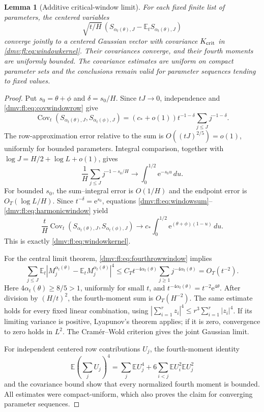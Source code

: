 \documentclass[11pt,letterpaper]{article}
\numberwithin{equation}{section}
\newtheorem{lemma}[theorem]{Lemma}
\theoremstyle{definition}\newtheorem{definition}[theorem]{Definition}
\theoremstyle{remark}\newtheorem{remark}[theorem]{Remark}
\newcommand{\E}{\mathbb E}
\newcommand{\ee}{\mathrm e}
\DeclareMathOperator{\Cov}{Cov}
\begin{document}
\begin{lemma}[Additive critical-window limit]\label{dmv:fl:lem:additivewindow}
For each fixed finite list of parameters, the centered variables
\[
 \sqrt{t/H}\,
 (S_{\alpha_t(\theta),J}-\E_tS_{\alpha_t(\theta),J})
\]
converge jointly to a centered Gaussian vector with covariance
$K_{\rm crit}$ in \eqref{dmv:fl:eq:windowkernel}. Their covariances converge,
and their fourth moments are uniformly bounded. The covariance estimates
are uniform on compact parameter sets and the conclusions remain valid
for parameter sequences tending to fixed values.
\end{lemma}
\begin{proof}
Put $s_0=\theta+\phi$ and $\delta=s_0/H$. Since $tJ\to0$,
independence and \eqref{dmv:fl:eq:covwindowrow} give
\begin{equation}\label{dmv:fl:eq:windowsum}
 \Cov_t(S_{\alpha_t(\theta),J},S_{\alpha_t(\phi),J})
 =(c_*+o(1))t^{-1-\delta}\sum_{j\le J}j^{-1-\delta}.
\end{equation}
The row-approximation error relative to the sum is
$O((tJ)^{2/5})=o(1)$, uniformly for bounded parameters. Integral
comparison, together with $\log J=H/2+\log L+o(1)$, gives
\begin{equation}\label{dmv:fl:eq:harmonicwindow}
 \frac1H\sum_{j\le J}j^{-1-s_0/H}
 \longrightarrow\int_0^{1/2}\ee^{-s_0u}\,du.
\end{equation}
For bounded $s_0$, the sum--integral error is $O(1/H)$ and the
endpoint error is $O_T(\log L/H)$. Since $t^{-\delta}=\ee^{s_0}$,
equations \eqref{dmv:fl:eq:windowsum}--\eqref{dmv:fl:eq:harmonicwindow} yield
\[
 \frac tH\Cov_t(S_{\alpha_t(\theta),J},S_{\alpha_t(\phi),J})
 \longrightarrow c_*\int_0^{1/2}\ee^{(\theta+\phi)(1-u)}\,du.
\]
This is exactly \eqref{dmv:fl:eq:windowkernel}.

For the central limit theorem, \eqref{dmv:fl:eq:fourthrowwindow} implies
\[
 \sum_{j\le J}
 \E_t|M_j^{\alpha_t(\theta)}-\E_tM_j^{\alpha_t(\theta)}|^4
 \le C_Tt^{-4\alpha_t(\theta)}
       \sum_{j\ge1}j^{-4\alpha_t(\theta)}=O_T(t^{-2}).
\]
Here $4\alpha_t(\theta)\ge8/5>1$, uniformly for small $t$, and
$t^{-4\alpha_t(\theta)}=t^{-2}\ee^{4\theta}$.
After division by $(H/t)^2$, the fourth-moment sum is $O_T(H^{-2})$.
The same estimate holds for every fixed linear combination, using
$|\sum_{i=1}^r z_i|^4\le r^3\sum_{i=1}^r|z_i|^4$.
If its limiting variance is positive, Lyapunov's theorem applies;
if it is zero, convergence to zero holds in $L^2$. The Cram\'er--Wold
criterion gives the joint Gaussian limit.

For independent centered row contributions $U_j$, the fourth-moment
identity
\[
 \E\left(\sum_j U_j\right)^4
 =\sum_j\E U_j^4+6\sum_{i<j}\E U_i^2\E U_j^2
\]
and the covariance bound show that every normalized fourth moment is
bounded. All estimates were compact-uniform, which also proves the
claim for converging parameter sequences.
\end{proof}
\end{document}
